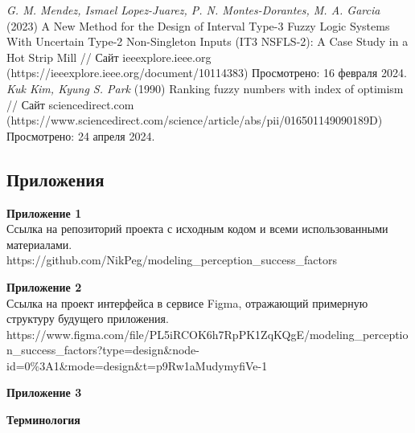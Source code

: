 \documentclass{article}
\newcommand\zz[1]{\par{\normalsize\strut #1} \hfill\ignorespaces}
\begin{document}
\begin{thebibliography}{}
         \textit{G. M. Mendez, Ismael Lopez-Juarez, P. N. Montes-Dorantes, M. A. Garcia} (2023) A New Method for the Design of Interval Type-3 Fuzzy Logic Systems With Uncertain Type-2 Non-Singleton Inputs (IT3 NSFLS-2): A Case Study in a Hot Strip Mill // Сайт ieeexplore.ieee.org (https://ieeexplore.ieee.org/document/10114383) Просмотрено: 16 февраля 2024.
         \textit{Kuk Kim, Kyung S. Park} (1990) Ranking fuzzy numbers with index of optimism // Сайт sciencedirect.com (https://www.sciencedirect.com/science/article/abs/pii/016501149090189D) Просмотрено: 24 апреля 2024.

    \end{thebibliography}

    \newpage
    \begin{center}
        \section*{Приложения}
    \end{center}
    \zz{}\textbf{Приложение 1\\}
    Ссылка на репозиторий проекта с исходным кодом и всеми использованными материалами.\\
    https://github.com/NikPeg/modeling\_perception\_success\_factors\\
    \zz{}\textbf{Приложение 2\\}
    Ссылка на проект интерфейса в сервисе Figma, отражающий примерную структуру будущего приложения.\\
    https://www.figma.com/file/PL5iRCOK6h7RpPK1ZqKQgE/modeling\_perception\_success\_factors?type=design\&node-id=0\%3A1\&mode=design\&t=p9Rw1aMudymyfiVe-1\\
    \zz{}\textbf{Приложение 3\\}
    \zz{}\textbf{Терминология\\}
\end{document}
